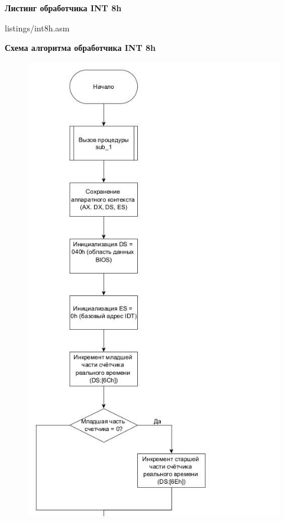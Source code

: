 \begin{center}
{\bf\normalsize Листинг обработчика INT 8h}
\end{center}

\begin{lstinputlisting}[style={asm},linerange={1-102}]{listings/int8h.asm}
\end{lstinputlisting}

\newpage
\begin{center}
{\bf\normalsize Схема алгоритма обработчика INT 8h}
\end{center}

\begin{figure}[!ht]
    \begin{center}
        \includegraphics[width=12cm]{img/int8h.1.1}
    \end{center}
\end{figure}

